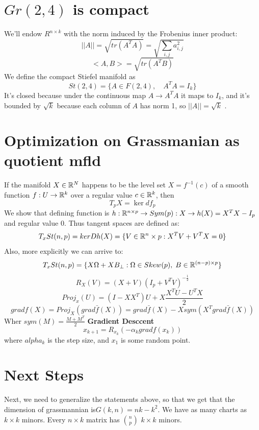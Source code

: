 \documentclass[11pt,a4paper]{report}
\begin{document}
\chapter{$Gr(2,4)$ is compact}
We'll endow $R^{n \times k} $ with the norm induced by the
Frobenius inner product:
$$ || A || = \sqrt{tr (A^T A)} = \sqrt{\sum_{i,j} a^2_{i,j}} $$
$$ <A,B> = \sqrt{tr(A^T B)} $$
We define the compact Stiefel manifold as
$$ St(2,4) = \{ A \in F(2,4), \quad  A^T A = I_k \}  $$
It's closed because under the continuous map $A \to A^T A$ it maps to $I_k$,
and it's bounded by $\sqrt{k}$ because each column of $A$ has norm 1, so $||A|| = \sqrt{k}$ .
\chapter{Optimization on Grassmanian as quotient mfld}
\begin{Def}
    If the manifold $X \in \mathbb{R}^N$ happens to be the level set $X = f^{-1} (c)$ of a smooth function
    $f: U \to \mathbb{R}^k$ over a regular value $c \in \mathbb{R}^k$, then 
    $$ T_p X = \ker d f_p $$
    We show that defining function is $h: \mathbb{R}^{n \times p} \to Sym(p): X \to h(X) = X^T X - I_p $ and regular value $0$.
    Thus tangent spaces are defined as:
    $$ T_x St(n,p) = ker Dh(X) = \{ V \in \mathbb{R}^n \times p : X^T V + V^T X = 0 \} $$
    Also, more explicitly we can arrive to:
    $$ T_x St(n,p) = \{ X \Omega + X B_{\bot} : \Omega \in Skew(p), \; B \in \mathbb{R}^{ (n-p)\times p} \} $$
    $$ R_X(V) = (X + V) (I_p + V^T V)^{-\frac{1}{2}}  $$
    $$Proj_x(U) = (I - X X^T) U + X \frac{X^T U - U^T X}{2} $$
    $$ grad f(X) = Proj_{X} (grad \bar{f}(X)) = grad \bar{f}(X) - X sym (X^T grad \bar{f}(X)) $$
    Wher $sym(M) = \frac{ M + M^T}{2} $
    \newline
    \textbf{Gradient Desccent}
    $$ x_{k+1} = R_{x_k}(-\alpha_k gradf(x_k))$$
    where $alpha_k$ is the step size, and $x_1$ is some random point.
\end{Def}
\chapter{Next Steps}
Next, we need to generalize the statements above, so that we get that the dimension of grassmannian is$ G(k,n) = n k-k^2$.
We have as many charts as $k \times k$ minors. Every $ n \times k$ matrix has ${n \choose p}$ $k\times k$ minors.
\end{document}
